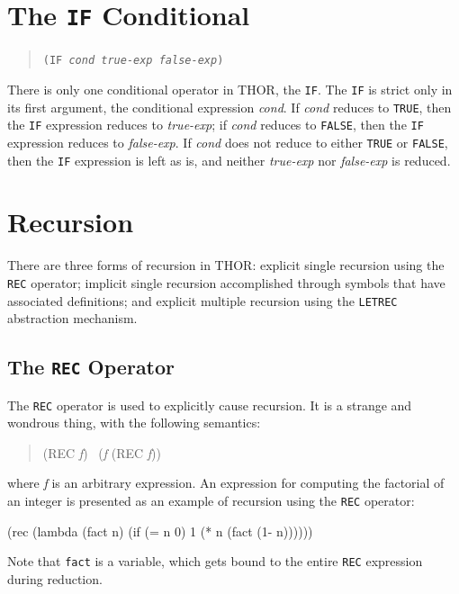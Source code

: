 \section{The {\tt IF} Conditional}

\begin{quote}
	{\tt (IF {\sl cond} {\sl true-exp} {\sl false-exp})}
\end{quote}

	There is only one conditional operator in THOR, the {\tt IF}.
The {\tt IF} is strict only in its first argument, the conditional
expression {\sl cond}.  If {\sl cond} reduces to {\tt TRUE}, then the 
{\tt IF} expression reduces to {\sl true-exp};  if {\sl cond} reduces to
{\tt FALSE}, then the {\tt IF} expression reduces to {\sl false-exp}. 
If {\sl cond} does not reduce to either {\tt TRUE} or {\tt FALSE}, then
the {\tt IF} expression is left as is, and neither {\sl true-exp} nor
{\sl false-exp} is reduced.


\section{Recursion}

	There are three forms of recursion in THOR:  explicit single
recursion using the {\tt REC} operator; implicit single recursion
accomplished through symbols that have associated definitions; and
explicit multiple recursion using the {\tt LETREC} abstraction
mechanism.

\subsection{The {\tt REC} Operator}

	The {\tt REC} operator is used to explicitly cause recursion.  It is a
strange and wondrous thing, with the following semantics:
\begin{quote}\begin{tt}
	(REC {\sl f}) \reds\ ({\sl f} (REC {\sl f}))
\end{tt}\end{quote}
where {\sl f} is an arbitrary expression.  An expression for computing
the factorial of an integer is presented as an example of recursion using
the {\tt REC} operator:
\begin{center}\begin{tt}
	(rec (lambda (fact n) (if (= n 0) 1 (* n (fact (1- n))))))
\end{tt}\end{center}
Note that {\tt fact} is a variable, which gets bound to the
entire {\tt REC} expression during reduction.

